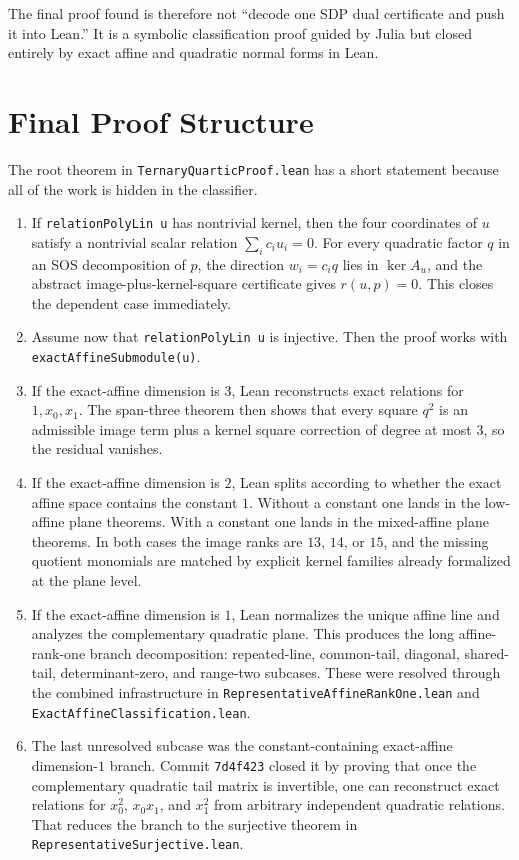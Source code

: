 \documentclass[10pt]{article}
\begin{document}
The final proof found is therefore not ``decode one SDP dual certificate and
push it into Lean.'' It is a symbolic classification proof guided by Julia but
closed entirely by exact affine and quadratic normal forms in Lean.

\section*{Final Proof Structure}
The root theorem in \texttt{TernaryQuarticProof.lean} has a short statement
because all of the work is hidden in the classifier.

\begin{enumerate}
\item If \texttt{relationPolyLin u} has nontrivial kernel, then the four
coordinates of $u$ satisfy a nontrivial scalar relation
$\sum_i c_i u_i = 0$. For every quadratic factor $q$ in an SOS decomposition of
$p$, the direction $w_i=c_i q$ lies in $\ker A_u$, and the abstract
image-plus-kernel-square certificate gives $r(u,p)=0$. This closes the
dependent case immediately.
\item Assume now that \texttt{relationPolyLin u} is injective. Then the proof
works with \texttt{exactAffineSubmodule(u)}.
\item If the exact-affine dimension is $3$, Lean reconstructs exact relations
for $1,x_0,x_1$. The span-three theorem then shows that every square $q^2$ is
an admissible image term plus a kernel square correction of degree at most $3$,
so the residual vanishes.
\item If the exact-affine dimension is $2$, Lean splits according to whether
the exact affine space contains the constant $1$. Without a constant one lands
in the low-affine plane theorems. With a constant one lands in the mixed-affine
plane theorems. In both cases the image ranks are $13$, $14$, or $15$, and the
missing quotient monomials are matched by explicit kernel families already
formalized at the plane level.
\item If the exact-affine dimension is $1$, Lean normalizes the unique affine
line and analyzes the complementary quadratic plane. This produces the long
affine-rank-one branch decomposition: repeated-line, common-tail, diagonal,
shared-tail, determinant-zero, and range-two subcases. These were resolved
through the combined infrastructure in
\texttt{RepresentativeAffineRankOne.lean} and
\texttt{ExactAffineClassification.lean}.
\item The last unresolved subcase was the constant-containing exact-affine
dimension-$1$ branch. Commit \texttt{7d4f423} closed it by proving that once
the complementary quadratic tail matrix is invertible, one can reconstruct
exact relations for $x_0^2$, $x_0x_1$, and $x_1^2$ from arbitrary independent
quadratic relations. That reduces the branch to the surjective theorem in
\texttt{RepresentativeSurjective.lean}.
\end{enumerate}
\end{document}
